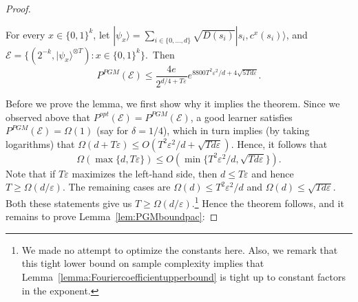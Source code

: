 \documentclass[twoside,11pt]{article}
\newcommand{\eps}{\varepsilon}
\newcommand{\ket}[1]{|#1\rangle}
\newcommand{\E}{\mathcal{E}}
\def\01{\{0,1\}}
\begin{document}
\begin{proof}
	\begin{lemma}\label{lem:PGMboundpac}
		For every $x\in \01^k$, let $\ket{\psi_x}=\sum_{i\in \{0,\ldots, d\}} \sqrt{D(s_i)} \ket{s_i, c^x(s_i)}$, and $\E=\{(2^{-k},\ket{\psi_x}^{\otimes T}):x\in \01^k\}$.~Then
		$$
		P^{PGM} (\E)\leq  \frac{4e}{2^{d/4+T\eps}}e^{8800T^2\eps^2/d+4\sqrt{5Td\eps}}.
		$$
	\end{lemma}
	
	Before we prove the lemma, we first show why it implies the theorem. Since we observed above that $P^{opt}(\E)=P^{PGM}(\E)$, a good learner satisfies $P^{PGM}(\E)=\Omega(1)$ (say for $\delta=1/4$), which in turn implies (by taking logarithms) that $\Omega(d+T\eps)\leq O(T^2\eps^2/d+\sqrt{Td\eps} )$. Hence, it follows that
	$$
	\Omega(\max\{d,T\eps\})\leq O(\min\{T^2\eps^2/d,\sqrt{Td\eps }\}).
	$$
	Note that if $T\eps$ maximizes the left-hand side, then $d\leq T\eps$ and hence $T\geq \Omega(d/\eps)$. The remaining cases are $\Omega(d)\leq T^2\eps^2/d$ and $\Omega(d)\leq \sqrt{Td\eps}$. Both these statements give us $T\geq \Omega(d/\eps)$.\footnote{We made no attempt to optimize the constants here. Also, we remark that this tight lower bound on sample complexity implies that Lemma~\ref{lemma:Fouriercoefficientupperbound} is tight up to constant factors in the exponent.} Hence the theorem follows, and it remains to prove Lemma~\ref{lem:PGMboundpac}:
	\vspace{3 pt}


\end{proof}
\end{document}
